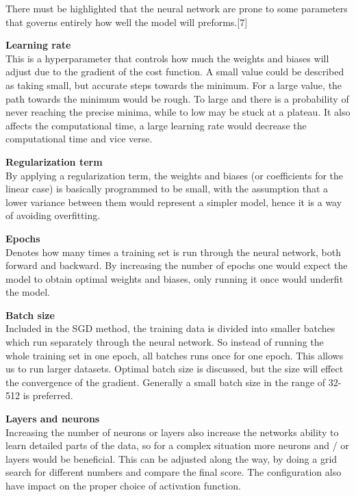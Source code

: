 There must be highlighted that the neural network are prone to some parameters that governs entirely how well the model will preforms.[7]
\\
\par
\textbf{Learning rate}\\
This is a hyperparameter that controls how much the weights and biases will adjust due to the gradient of the cost function. A small value could be described as taking small, but accurate steps towards the minimum. For a large value, the path towards the minimum would be rough. To large and there is a probability of never reaching the precise minima, while to low may be stuck at a plateau. It also affects the computational time, a large learning rate would decrease the computational time and vice verse.
\\
\par
\textbf{Regularization term}\\
By applying a regularization term, the weights and biases (or coefficients for the linear case) is basically programmed to be small, with the assumption that a lower variance between them would represent a simpler model, hence it is a way of avoiding overfitting.
\\
\par
\textbf{Epochs}\\
Denotes how many times a training set is run through the neural network, both forward and backward. By increasing the number of epochs one would expect the model to obtain optimal weights and biases, only running it once would underfit the model.
\\
\par
\textbf{Batch size}\\
Included in the SGD method, the training data is divided into smaller batches which run separately through the neural network. So instead of running the whole training set in one epoch, all batches runs once for one epoch. This allows us to run larger datasets. Optimal batch size is discussed, but the size will effect the convergence of the gradient. Generally a small batch size in the range of 32-512 is preferred.
\\
\par
\textbf{Layers and neurons}\\
Increasing the number of neurons or layers also increase the networks ability to learn detailed parts of the data, so for a complex situation more neurons and / or layers would be beneficial. This can be adjusted along the way, by doing a grid search for different numbers and compare the final score. The configuration also have impact on the proper choice of activation function.
